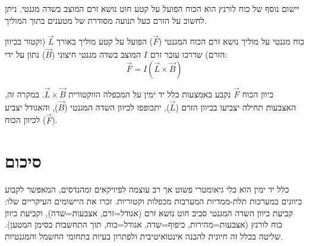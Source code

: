 \documentclass[12pt]{article}
\begin{document}
יישום נוסף של כוח לורנץ הוא הכוח הפועל על קטע חוט נושא זרם המוצב בשדה מגנטי. ניתן לחשוב על הזרם כעל תנועה מסודרת של מטענים בתוך המוליך.

\begin{definitionBox}{כוח מגנטי על מוליך נושא זרם}
הכוח המגנטי (\( \vec{F} \)) הפועל על קטע מוליך באורך \( \vec{L} \) (וקטור בכיוון הזרם) שדרכו עובר זרם \( I \) המוצב בשדה מגנטי חיצוני (\( \vec{B} \)) נתון על ידי:
\[ \vec{F} = I (\vec{L} \times \vec{B}) \]
\end{definitionBox}

כיוון הכוח \( \vec{F} \) נקבע באמצעות כלל יד ימין על המכפלה הווקטורית \( \vec{L} \times \vec{B} \). במקרה זה, האצבעות תחילה יצביעו בכיוון הזרם (\( \vec{L} \)), יתכופפו לכיוון השדה המגנטי (\( \vec{B} \)), והאגודל יצביע לכיוון הכוח (\( \vec{F} \)).

\section{סיכום}
כלל יד ימין הוא כלי גיאומטרי פשוט אך רב עוצמה לפיזיקאים ומהנדסים, המאפשר לקבוע כיוונים במערכות תלת-ממדיות המערבות מכפלות וקטוריות. זכרו את היישומים העיקריים שלו: קביעת כיוון השדה המגנטי סביב חוט נושא זרם (אגודל=זרם, אצבעות=שדה), וקביעת כיוון כוח לורנץ (אצבעות=מהירות, כיפוף=שדה, אגודל=כוח, תוך התחשבות בסימן המטען). שליטה בכלל זה חיונית להבנה אינטואיטיבית ולפתרון בעיות בתחומי החשמל והמגנטיות.
\end{document}
